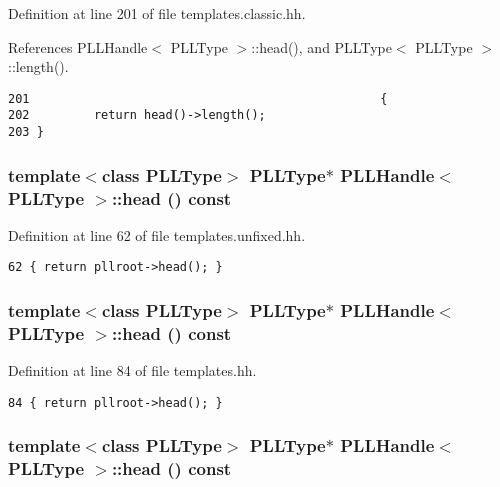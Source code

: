 Definition at line 201 of file templates.classic.hh.

References PLLHandle$<$ PLLType $>$::head(), and PLLType$<$ PLLType $>$::length().



\footnotesize\begin{verbatim}201                                                 { 
202         return head()->length(); 
203 } 
\end{verbatim}\normalsize 
{}
\subsubsection{\setlength{\rightskip}{0pt plus 5cm}template$<$class PLLType$>$ {\bf PLLType}$\ast$ PLLHandle$<$ {\bf PLLType} $>$::head () const\hspace{0.3cm}{\tt  [inline]}}\label{classPLLHandle_a42}




Definition at line 62 of file templates.unfixed.hh.



\footnotesize\begin{verbatim}62 { return pllroot->head(); } 
\end{verbatim}\normalsize 
{}
\subsubsection{\setlength{\rightskip}{0pt plus 5cm}template$<$class PLLType$>$ {\bf PLLType}$\ast$ PLLHandle$<$ {\bf PLLType} $>$::head () const\hspace{0.3cm}{\tt  [inline]}}\label{classPLLHandle_a29}




Definition at line 84 of file templates.hh.



\footnotesize\begin{verbatim}84 { return pllroot->head(); } 
\end{verbatim}\normalsize 
{}
\subsubsection{\setlength{\rightskip}{0pt plus 5cm}template$<$class PLLType$>$ {\bf PLLType}$\ast$ PLLHandle$<$ {\bf PLLType} $>$::head () const\hspace{0.3cm}{\tt  [inline]}}\label{classPLLHandle_a16}




